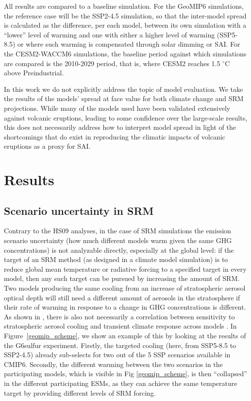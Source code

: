 \documentclass[acp, manuscript]{copernicus}
\begin{document}
All results are compared to a baseline simulation. For the GeoMIP6 simulations, the reference case will be the SSP2-4.5 simulation, so that the inter-model spread is calculated as the difference, per each model, between its own simulation with a ``lower'' level of warming and one with either a higher level of warming (SSP5-8.5) or where such warming is compensated through solar dimming or SAI. For the CESM2-WACCM6 simulations, the baseline period against which simulations are compared is the 2010-2029 period, that is, where CESM2 reaches 1.5 $^\circ$C above Preindustrial.

In this work we do not explicitly address the topic of model evaluation. We take the results of the models' spread at face value for both climate change and SRM projections. While many of the models used have been validated extensively against volcanic eruptions, leading to some confidence over the large-scale results, this does not necessarily address how to interpret model spread in light of the shortcomings that do exist in reproducing the climatic impacts of volcanic eruptions as a proxy for SAI.

\section{Results}

\subsection{Scenario uncertainty in SRM}

Contrary to the HS09 analyses, in the case of SRM simulations the emission scenario uncertainty (how much different models warm given the same GHG concentrations) is not analyzable directly, especially at the global level: if the target of an SRM method (as designed in a climate model simulation) is to reduce global mean temperature or radiative forcing to a specified target in every model, then any such target can be pursued by increasing the amount of SRM. Two models producing the same cooling from an increase of stratospheric aerosol optical depth will still need a different amount of aerosols in the stratosphere if their rate of warming in response to a change in GHG concentrations is different. As shown in \cite{Visioni2021}, there is also not necessarily a correlation between sensitivity to stratospheric aerosol cooling and transient climate response across models \citep[similarly, independently verified in CMIP6 models for volcanic eruptions in][]{Pauling2023}. In Figure~\ref{geomip_scheme}, we show an example of this by looking at the results of the G6sulfur experiment. Firstly, the targeted cooling (here, from SSP5-8.5 to SSP2-4.5) already sub-selects for two out of the 5 SSP scenarios available in CMIP6. Secondly, the different warming between the two scenarios in the participating models, which is visible in Fig \ref{geomip_scheme}, is then ``collapsed'' in the different participating ESMs, as they can achieve the same temperature target by providing different levels of SRM forcing.
\end{document}
